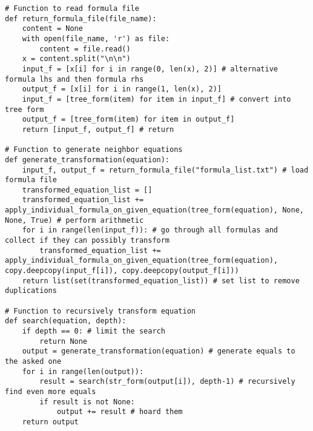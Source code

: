 \documentclass{book}
\begin{document}
\begin{lstlisting}[style=mystyle, caption={main.py}, label={lst:python_code}]
# Function to read formula file
def return_formula_file(file_name):
    content = None
    with open(file_name, 'r') as file:
        content = file.read()
    x = content.split("\n\n")
    input_f = [x[i] for i in range(0, len(x), 2)] # alternative formula lhs and then formula rhs
    output_f = [x[i] for i in range(1, len(x), 2)]
    input_f = [tree_form(item) for item in input_f] # convert into tree form
    output_f = [tree_form(item) for item in output_f]
    return [input_f, output_f] # return

# Function to generate neighbor equations
def generate_transformation(equation):
    input_f, output_f = return_formula_file("formula_list.txt") # load formula file
    transformed_equation_list = []
    transformed_equation_list += apply_individual_formula_on_given_equation(tree_form(equation), None, None, True) # perform arithmetic
    for i in range(len(input_f)): # go through all formulas and collect if they can possibly transform
        transformed_equation_list += apply_individual_formula_on_given_equation(tree_form(equation), copy.deepcopy(input_f[i]), copy.deepcopy(output_f[i]))
    return list(set(transformed_equation_list)) # set list to remove duplications

# Function to recursively transform equation
def search(equation, depth):
    if depth == 0: # limit the search
        return None
    output = generate_transformation(equation) # generate equals to the asked one
    for i in range(len(output)):
        result = search(str_form(output[i]), depth-1) # recursively find even more equals
        if result is not None:
            output += result # hoard them
    return output


\end{lstlisting}
\end{document}
